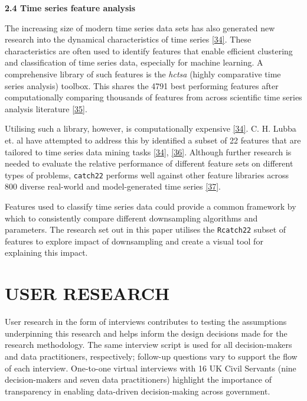 \documentclass{article}
\begin{document}
\textbf{2.4 Time series feature analysis}

The increasing size of modern time series data sets has also generated
new research into the dynamical characteristics of time series
\protect\hyperlink{ref-catch22}{{[}34{]}}. These characteristics are
often used to identify features that enable efficient clustering and
classification of time series data, especially for machine learning. A
comprehensive library of such features is the \emph{hctsa} (highly
comparative time series analysis) toolbox. This shares the 4791 best
performing features after computationally comparing thousands of
features from across scientific time series analysis literature
\protect\hyperlink{ref-fulcher2017}{{[}35{]}}.

Utilising such a library, however, is computationally expensive
\protect\hyperlink{ref-catch22}{{[}34{]}}. C. H. Lubba et. al have
attempted to address this by identified a subset of 22 features that are
tailored to time series data mining tasks
\protect\hyperlink{ref-catch22}{{[}34{]}},
\protect\hyperlink{ref-bagnall}{{[}36{]}}. Although further research is
needed to evaluate the relative performance of different feature sets on
different types of problems, \texttt{catch22} performs well against
other feature libraries across 800 diverse real-world and
model-generated time series \protect\hyperlink{ref-henderson}{{[}37{]}}.

Features used to classify time series data could provide a common
framework by which to consistently compare different downsampling
algorithms and parameters. The research set out in this paper utilises
the \texttt{Rcatch22} subset of features to explore impact of
downsampling and create a visual tool for explaining this impact.

\hypertarget{user-research}{%
\section{USER RESEARCH}\label{user-research}}

User research in the form of interviews contributes to testing the
assumptions underpinning this research and helps inform the design
decisions made for the research methodology. The same interview script
is used for all decision-makers and data practitioners, respectively;
follow-up questions vary to support the flow of each interview.
One-to-one virtual interviews with 16 UK Civil Servants (nine
decision-makers and seven data practitioners) highlight the importance
of transparency in enabling data-driven decision-making across
government.
\end{document}
